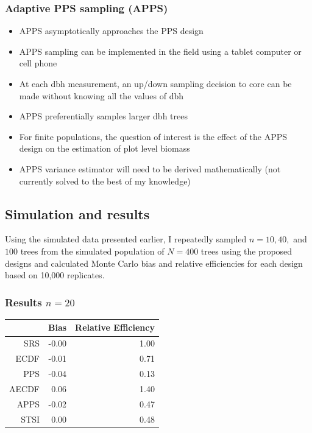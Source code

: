 \documentclass{beamer}
\begin{document}
\begin{frame}
  \frametitle{Adaptive PPS sampling (APPS)}
  \begin{itemize}
    \item APPS asymptotically approaches the PPS design \vspace{3mm}
    \item APPS sampling can be implemented in the field using  a tablet computer or cell phone \vspace{3mm}
    \item At each dbh measurement, an up/down sampling decision to core can be made without knowing all the values of dbh \vspace{3mm}
    \item APPS preferentially samples larger dbh trees \vspace{3mm}
    \item For finite populations, the question of interest is the effect of the APPS design on the estimation of plot level biomass \vspace{3mm}
    \item APPS variance estimator will need to be derived mathematically (not currently solved to the best of my knowledge)
  \end{itemize}
\end{frame}
%
\begin{frame}
  \section{Simulation and results}
  Using the simulated data presented earlier, I repeatedly sampled $n = 10, 40,$ and $100$ trees from the simulated population of $N = 400$ trees using the proposed designs and calculated Monte Carlo bias and relative efficiencies for each design based on 10,000 replicates. 
\end{frame}
%
\begin{frame}
  \frametitle{Results $n = 20$}
  \begin{table}[ht]
  \centering
  \begin{tabular}{rrr}
    \hline
    & Bias & Relative Efficiency \\ 
    \hline
    SRS & -0.00 & 1.00 \\ 
    ECDF & -0.01 & 0.71 \\ 
    PPS & -0.04 & 0.13 \\ 
    AECDF & 0.06 & 1.40 \\ 
    APPS & -0.02 & 0.47 \\ 
    STSI & 0.00 & 0.48 \\ 
   \hline
  \end{tabular}
  \end{table}
\end{frame}
\end{document}
